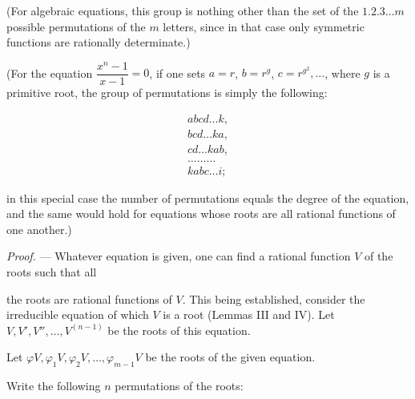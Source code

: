 (For algebraic equations, this group is nothing other than the set of the
$1.2.3\ldots m$ possible permutations of the $m$ letters, since in that case
only symmetric functions are rationally determinate.)

(For the equation $\dfrac{x^{n}-1}{x-1}=0$, if one sets $a=r$, $b=r^{g}$,
$c=r^{g^{2}},\ldots$, where $g$ is a primitive root, the group of permutations
is simply the following:

\[
\begin{array}{c}
abcd\ldots k,\\
bcd\ldots ka,\\
cd\ldots kab,\\
\ldots\ldots\ldots\\
kabc\ldots i;
\end{array}
\]

in this special case the number of permutations equals the degree of the
equation, and the same would hold for equations whose roots are all rational
functions of one another.)

\emph{Proof.} --- Whatever equation is given, one can find a rational function
$V$ of the roots such that all



the roots are rational functions of $V$. This being established, consider the
irreducible equation of which $V$ is a root (Lemmas III and IV). Let
$V,V',V'',\ldots,V^{(n-1)}$ be the roots of this equation.

Let $\varphi V,\varphi_{1}V,\varphi_{2}V,\ldots,\varphi_{m-1}V$ be the roots of
the given equation.

Write the following $n$ permutations of the roots:

